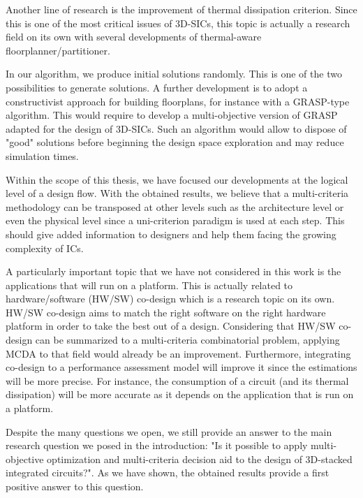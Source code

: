 Another line of research is the improvement of thermal dissipation criterion. Since this is one of the most critical issues of 3D-SICs, this topic is actually a research field on its own with several developments of thermal-aware floorplanner/partitioner.

In our algorithm, we produce initial solutions randomly. This is one of the two possibilities to generate solutions. A further development is to adopt a constructivist approach for building floorplans, for instance with a GRASP-type algorithm. This would require to develop a multi-objective version of GRASP adapted for the design of 3D-SICs. Such an algorithm would allow to dispose of "good" solutions before beginning the design space exploration and may reduce simulation times.

Within the scope of this thesis, we have focused our developments at the logical level of a design flow. With the obtained results, we believe that a multi-criteria methodology can be transposed at other levels such as the architecture level or even the physical level since a uni-criterion paradigm is used at each step. This should give added information to designers and help them facing the growing complexity of ICs.

A particularly important topic that we have not considered in this work is the applications that will run on a platform. This is actually related to hardware/software (HW/SW) co-design which is a research topic on its own. HW/SW co-design aims to match the right software on the right hardware platform in order to take the best out of a design. Considering that HW/SW co-design can be summarized to a multi-criteria combinatorial problem, applying MCDA to that field would already be an improvement. Furthermore, integrating co-design to a performance assessment model will improve it since the estimations will be more precise. For instance, the consumption of a circuit (and its thermal dissipation) will be more accurate as it depends on the application that is run on a platform.


Despite the many questions we open, we still provide an answer to the main research question we posed in the introduction: "Is it possible to apply multi-objective optimization and multi-criteria decision aid to the design of 3D-stacked integrated circuits?". As we have shown, the obtained results provide a first positive answer to this question.